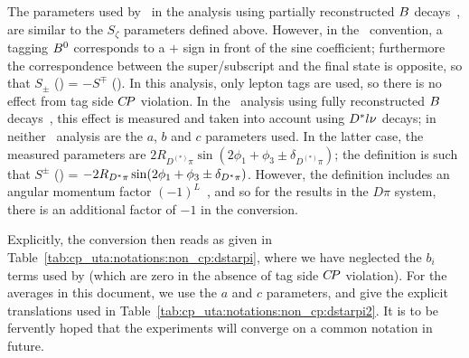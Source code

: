 The parameters used by \belle\ in the analysis using 
partially reconstructed $B$ decays~\cite{Bahinipati:2011yq}, 
are similar to the $S_\zeta$ parameters defined above. 
However, in the \belle\ convention, 
a tagging $B^0$ corresponds to a $+$ sign in front of the sine coefficient; 
furthermore the correspondence between the super/subscript 
and the final state is opposite, so that $S_\pm$ (\babar) = $- S^\mp$ (\belle). 
In this analysis, only lepton tags are used, 
so there is no effect from tag side $C\!P$ violation. 
In the \belle\ analysis using 
fully reconstructed $B$ decays~\cite{Ronga:2006hv}, 
this effect is measured and taken into account using $D^* l \nu$ decays; 
in neither \belle\ analysis are the $a$, $b$ and $c$ parameters used. 
In the latter case, the measured parameters are 
$2 R_{D^{(*)}\pi} \sin( 2\phi_1 + \phi_3 \pm \delta_{D^{(*)}\pi} )$; 
the definition is such that 
$S^\pm$ (\belle) = $- 2 R_{D^* \pi} \sin( 2\phi_1 + \phi_3 \pm \delta_{D^* \pi} )$. 
However, the definition includes an 
angular momentum factor $(-1)^L$~\cite{Fleischer:2003yb}, 
and so for the results in the $D\pi$ system, 
there is an additional factor of $-1$ in the conversion.

Explicitly, the conversion then reads as given in 
Table~\ref{tab:cp_uta:notations:non_cp:dstarpi}, 
where we have neglected the $b_i$ terms used by \babar
(which are zero in the absence of tag side $C\!P$ violation).
For the averages in this document,
we use the $a$ and $c$ parameters,
and give the explicit translations used in 
Table~\ref{tab:cp_uta:notations:non_cp:dstarpi2}.
It is to be fervently hoped that the experiments will
converge on a common notation in future.

